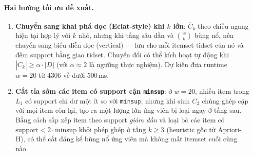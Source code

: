 \paragraph{Hai hướng tối ưu đề xuất.}
\begin{enumerate}
    \item \textbf{Chuyển sang khai phá dọc (Eclat-style) khi $k$ lớn}: $\overline{C}_k$ theo chiều ngang hiện tại hợp lý với $k$ nhỏ, nhưng khi tầng sâu dần và $\binom{w}{k}$ bùng nổ, nên chuyển sang biểu diễn dọc (vertical) --- lưu cho mỗi itemset tidset của nó và đếm support bằng giao tidset. Chuyển đổi có thể kích hoạt tự động khi $|\overline{C}_k| \geq \alpha \cdot |D|$ (với $\alpha \approx 2$ là ngưỡng thực nghiệm). Dự kiến đưa runtime $w=20$ từ $4306$ về dưới $500$\,ms.
    \item \textbf{Cắt tỉa sớm các item có support cận \texttt{minsup}}: ở $w=20$, nhiều item trong $L_1$ có support chỉ dư một ít so với \texttt{minsup}, nhưng khi sinh $C_2$ chúng ghép cặp với mọi item còn lại, tạo ra một lượng lớn ứng viên bị loại ngay ở tầng sau. Bằng cách sắp xếp item theo support \emph{giảm dần} và loại bỏ các item có $\text{support} < 2 \cdot \text{minsup}$ khỏi phép ghép ở tầng $k \geq 3$ (heuristic gốc từ Apriori-H), có thể cắt đáng kể bùng nổ ứng viên mà không mất itemset cuối cùng nào.
\end{enumerate}